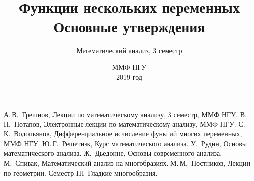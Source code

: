 \documentclass[oneside, final]{book}
\title{\textbf{Функции нескольких переменных}\\ Основные утверждения}
\author{Математический анализ, 3 семестр}
\date{ММФ НГУ\\ \vfill2019 год}
\theoremstyle{plain}
\theoremstyle{definition}
\begin{document}
	\maketitle
	
	\tableofcontents
	
	

	
		
	
	
	\begin{thebibliography}{0}
		 А.\,В.~Грешнов, Лекции по математическому анализу, 3 семестр, ММФ НГУ.
		 В.\,Н.~Потапов, Электронные лекции по математическому анализу, ММФ НГУ.
		 С.\,К.~Водопьянов, Дифференциальное исчисление функций многих переменных, ММФ НГУ.
		 Ю.\,Г.~Решетняк, Курс математического анализа.
		 У.~Рудин, Основы математического анализа.
		 Ж.~Дьедонне, Основы современного анализа.
		 М.~Спивак, Математический анализ на многобразиях.
		 М.\,М.~Постников, Лекции по геометрии. Семестр III. Гладкие многообразия.
	\end{thebibliography}
\end{document}
